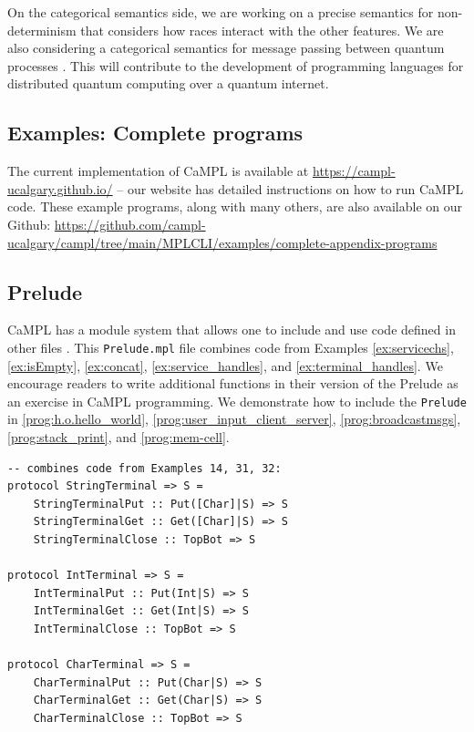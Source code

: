 \documentclass[11pt]{article}
\begin{document}
On the categorical semantics side, we are working on a precise semantics for non-determinism that considers how races interact with the other features.
We are also considering a categorical semantics for message passing between quantum processes \cite{QMP23}.
This will contribute to the development of programming languages for distributed quantum computing over a quantum internet.


\printbibliography


\begin{appendix}
\section{Examples: Complete programs}
\label{sec:appendix}

The current implementation of CaMPL is available at \url{https://campl-ucalgary.github.io/} -- our website has detailed instructions on how to run CaMPL code.
These example programs, along with many others, are also available on our Github:
\url{https://github.com/campl-ucalgary/campl/tree/main/MPLCLI/examples/complete-appendix-programs}

\subsection{Prelude}
\label{prog:prelude}

CaMPL has a module system that allows one to include and use code defined in other files \cite{Fo23mod}.
This \lstinline{Prelude.mpl} file combines code from Examples \ref{ex:servicechs}, \ref{ex:isEmpty}, \ref{ex:concat}, \ref{ex:service_handles}, and \ref{ex:terminal_handles}.
We encourage readers to write additional functions in their version of the Prelude as an exercise in CaMPL programming.
We demonstrate how to include the \lstinline{Prelude} in 
\ref{prog:h.o.hello_world}, \ref{prog:user_input_client_server}, \ref{prog:broadcastmsgs}, \ref{prog:stack_print}, and \ref{prog:mem-cell}.

\begin{lstlisting}
-- combines code from Examples 14, 31, 32:
protocol StringTerminal => S =
    StringTerminalPut :: Put([Char]|S) => S
    StringTerminalGet :: Get([Char]|S) => S 
    StringTerminalClose :: TopBot => S

protocol IntTerminal => S =
    IntTerminalPut :: Put(Int|S) => S
    IntTerminalGet :: Get(Int|S) => S 
    IntTerminalClose :: TopBot => S

protocol CharTerminal => S =
    CharTerminalPut :: Put(Char|S) => S
    CharTerminalGet :: Get(Char|S) => S 
    CharTerminalClose :: TopBot => S


\end{lstlisting}
\end{appendix}
\end{document}
